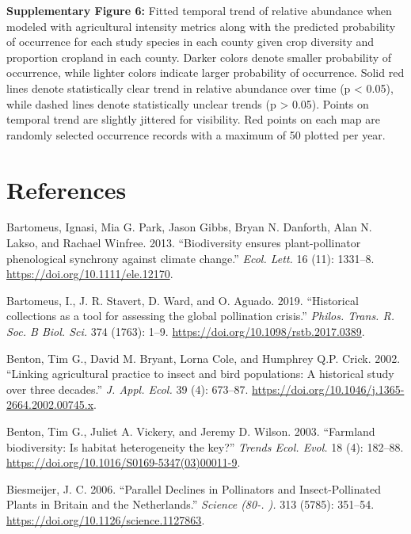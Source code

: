 \documentclass[11pt,]{article}
\begin{document}
\textbf{Supplementary Figure 6:} Fitted temporal trend of relative
abundance when modeled with agricultural intensity metrics along with
the predicted probability of occurrence for each study species in each
county given crop diversity and proportion cropland in each county.
Darker colors denote smaller probability of occurrence, while lighter
colors indicate larger probability of occurrence. Solid red lines denote
statistically clear trend in relative abundance over time (p \textless{}
0.05), while dashed lines denote statistically unclear trends (p
\textgreater{} 0.05). Points on temporal trend are slightly jittered for
visibility. Red points on each map are randomly selected occurrence
records with a maximum of 50 plotted per year.

\clearpage

\hypertarget{references}{%
\section*{References}\label{references}}

\hypertarget{refs}{}
\leavevmode\hypertarget{ref-Bartomeus2013}{}%
Bartomeus, Ignasi, Mia G. Park, Jason Gibbs, Bryan N. Danforth, Alan N.
Lakso, and Rachael Winfree. 2013. ``Biodiversity ensures
plant-pollinator phenological synchrony against climate change.''
\emph{Ecol. Lett.} 16 (11): 1331--8.
\url{https://doi.org/10.1111/ele.12170}.

\leavevmode\hypertarget{ref-Bartomeus2019}{}%
Bartomeus, I., J. R. Stavert, D. Ward, and O. Aguado. 2019. ``Historical
collections as a tool for assessing the global pollination crisis.''
\emph{Philos. Trans. R. Soc. B Biol. Sci.} 374 (1763): 1--9.
\url{https://doi.org/10.1098/rstb.2017.0389}.

\leavevmode\hypertarget{ref-Benton2002}{}%
Benton, Tim G., David M. Bryant, Lorna Cole, and Humphrey Q.P. Crick.
2002. ``Linking agricultural practice to insect and bird populations: A
historical study over three decades.'' \emph{J. Appl. Ecol.} 39 (4):
673--87. \url{https://doi.org/10.1046/j.1365-2664.2002.00745.x}.

\leavevmode\hypertarget{ref-Benton2003}{}%
Benton, Tim G., Juliet A. Vickery, and Jeremy D. Wilson. 2003.
``Farmland biodiversity: Is habitat heterogeneity the key?''
\emph{Trends Ecol. Evol.} 18 (4): 182--88.
\url{https://doi.org/10.1016/S0169-5347(03)00011-9}.

\leavevmode\hypertarget{ref-Biesmeijer2006}{}%
Biesmeijer, J. C. 2006. ``Parallel Declines in Pollinators and
Insect-Pollinated Plants in Britain and the Netherlands.'' \emph{Science
(80-. ).} 313 (5785): 351--54.
\url{https://doi.org/10.1126/science.1127863}.
\end{document}
